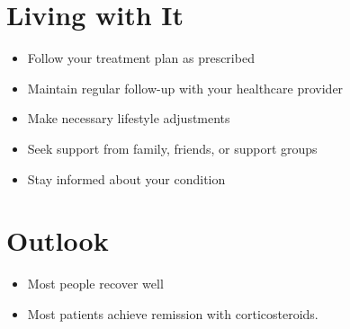 \section{Living with It}
\begin{itemize}[noitemsep]
  \item Follow your treatment plan as prescribed
  \item Maintain regular follow-up with your healthcare provider
  \item Make necessary lifestyle adjustments
  \item Seek support from family, friends, or support groups
  \item Stay informed about your condition
\end{itemize}
\section{Outlook}
\begin{itemize}[noitemsep]
  \item Most people recover well
  \item Most patients achieve remission with corticosteroids.
\end{itemize}
